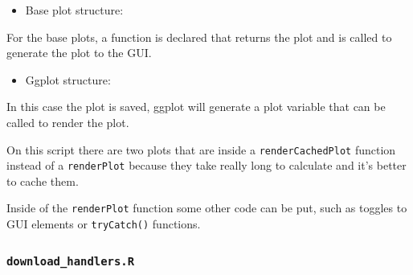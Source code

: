 \documentclass[
]{book}
\newenvironment{Shaded}{\begin{snugshade}}{\end{snugshade}}
\newcommand{\ControlFlowTok}[1]{\textcolor[rgb]{0.13,0.29,0.53}{\textbf{#1}}}
\newcommand{\KeywordTok}[1]{\textcolor[rgb]{0.13,0.29,0.53}{\textbf{#1}}}
\newcommand{\NormalTok}[1]{#1}
\newcommand{\OperatorTok}[1]{\textcolor[rgb]{0.81,0.36,0.00}{\textbf{#1}}}
\newcommand{\StringTok}[1]{\textcolor[rgb]{0.31,0.60,0.02}{#1}}
\providecommand{\tightlist}{%
  \setlength{\itemsep}{0pt}\setlength{\parskip}{0pt}}
\begin{document}
\begin{itemize}
\tightlist
\item
  Base plot structure:
\end{itemize}

\begin{Shaded}
\end{Shaded}

For the base plots, a function is declared that returns the plot and is called to generate the plot to the GUI.

\begin{itemize}
\tightlist
\item
  Ggplot structure:
\end{itemize}

\begin{Shaded}
\end{Shaded}

In this case the plot is saved, ggplot will generate a plot variable that can be called to render the plot.

On this script there are two plots that are inside a \texttt{renderCachedPlot} function instead of a \texttt{renderPlot} because they take really long to calculate and it's better to cache them.

Inside of the \texttt{renderPlot} function some other code can be put, such as toggles to GUI elements or \texttt{tryCatch()} functions.

\hypertarget{download_handlers.r}{%
\subsubsection{\texorpdfstring{\texttt{download\_handlers.R}}{download\_handlers.R}}\label{download_handlers.r}}
\end{document}
